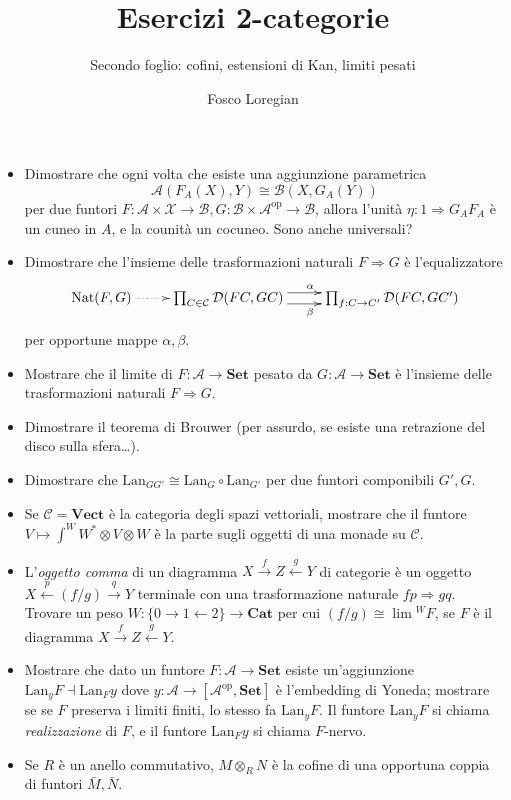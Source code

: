 \documentclass{amsart}
\title{Esercizi 2-categorie}
\subtitle{Secondo foglio: cofini, estensioni di Kan, limiti pesati}
\author{Fosco Loregian}
\def\Lan{\text{Lan}}
\begin{document}
\maketitle
\begin{itemize}
\item Dimostrare che ogni volta che esiste una aggiunzione parametrica
\[
\mathcal A(F_A(X),Y)\cong \mathcal B(X, G_A(Y))
\]
per due funtori $F : \mathcal A\times\mathcal X\to\mathcal B,G : \mathcal B\times\mathcal A^\text{op}\to\mathcal B$, allora l'unità $\eta : 1 \Rightarrow G_AF_A$ è un cuneo in $A$, e la counità un cocuneo. Sono anche universali?
\item Dimostrare che l'insieme delle trasformazioni naturali $F\Rightarrow G$ è l'equalizzatore
\[
\xymatrix{
\text{Nat}(F,G) \ar@{.>}[r]& \prod_{C\in\mathcal C} \mathcal D(FC,GC) \ar@<4pt>[r]^\alpha\ar@<-4pt>[r]_\beta & \prod_{f : C\to C'} \mathcal D(FC,GC') 
}
\]
per opportune mappe $\alpha,\beta$.
\item Mostrare che il limite di $F : \mathcal A \to \mathbf{Set}$ pesato da $G : \mathcal A \to \mathbf{Set}$ è l'insieme delle trasformazioni naturali $F\Rightarrow G$.
\item Dimostrare il teorema di Brouwer (per assurdo, se esiste una retrazione del disco sulla sfera\dots).
\item Dimostrare che $\Lan_{GG'}\cong \Lan_G\circ\Lan_{G'}$ per due funtori componibili $G',G$.
\item Se $\mathcal C = \mathbf{Vect}$ è la categoria degli spazi vettoriali, mostrare che il funtore $V\mapsto \int^W W^* \otimes V \otimes W$ è la parte sugli oggetti di una monade su $\mathcal C$.
\item L'\emph{oggetto comma} di un diagramma $X \xrightarrow{f}Z\xleftarrow{g}Y$ di categorie è un oggetto $X \xleftarrow{p}(f/g)\xrightarrow{q}Y$ terminale con una trasformazione naturale $fp\Rightarrow gq$. Trovare un peso $W : \{0\to 1\leftarrow 2\} \to \mathbf{Cat}$ per cui $(f/g)\cong \lim{}^WF$, se $F$ è il diagramma $X \xrightarrow{f}Z\xleftarrow{g}Y$.
\item Mostrare che dato un funtore $F : \mathcal A\to \mathbf{Set}$ esiste un'aggiunzione $\Lan_yF\dashv\Lan_Fy$ dove $y : \mathcal A \to [\mathcal A^\text{op},\mathbf{Set}]$ è l'embedding di Yoneda; mostrare se se $F$ preserva i limiti finiti, lo stesso fa $\Lan_yF$. Il funtore $\Lan_yF$ si chiama \emph{realizzazione} di $F$, e il funtore $\Lan_Fy$ si chiama $F$-nervo.
\item Se $R$ è un anello commutativo, $M\otimes_R N$ è la cofine di una opportuna coppia di funtori $\bar M,\bar N$.

\end{itemize}
\end{document}

